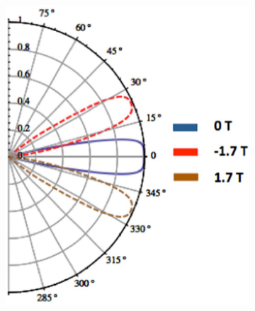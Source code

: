     \begin{figure}[H]
        \centering
        \begin{subfigure}[b]{0.4\linewidth}
            \includegraphics[width = \linewidth]{fig/Chap 2/klein b field 1.png}
            \caption{}
            \label{2fig:klein b field 1}
            \end{subfigure}
            \begin{subfigure}[b]{0.4\linewidth}

\end{subfigure}
\end{figure}
